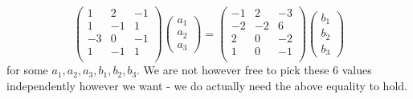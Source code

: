 \documentclass{article}
\newcommand{\chapternumber}{2}
\newenvironment{QandA}{\begin{enumerate}[label=\chapternumber.\arabic*]\bfseries\boldmath}
	{\end{enumerate}}
\newenvironment{answered}{\par\bigskip\normalfont\unboldmath}{}
\begin{document}
\begin{QandA}
\begin{answered}
\[\begin{pmatrix}
				1 &  2 & -1 \\
				1 & -1 &  1 \\
				-3 &  0 & -1 \\
				1 & -1 &  1 \\
			\end{pmatrix}
			\begin{pmatrix}
				a_1 \\ a_2 \\ a_3
			\end{pmatrix}
			=	
			\begin{pmatrix}
				-1 &  2 & -3 \\
				-2 & -2 &  6 \\
				2 &  0 & -2 \\
				1 &  0 & -1 \\
			\end{pmatrix}
			\begin{pmatrix}
				b_1 \\ b_2 \\ b_3
			\end{pmatrix}
			\]
			for some $a_1,a_2,a_3,b_1,b_2,b_3$. We are not however free to pick these 6 values independently however we want - we do actually need the above equality to hold.
			

\end{answered}
\end{QandA}
\end{document}
